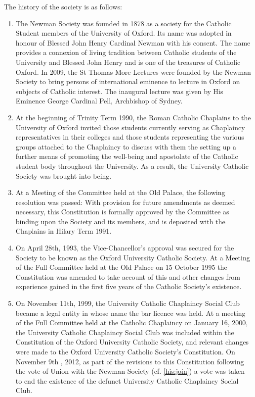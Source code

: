 \documentclass[11pt]{article}
\begin{document}
\begin{enumerate}
The history of the society is as follows:
\begin{enumerate}
\item \label{his:fou} The Newman Society was founded in 1878 as a society for the Catholic Student members of the University of Oxford.  Its name was adopted in honour of Blessed John Henry Cardinal Newman with his consent. The name provides a connexion of living tradition between Catholic students of the University and Blessed John Henry and is one of the treasures of Catholic Oxford. In 2009, the St Thomas More Lectures were founded by the Newman Society to bring persons of international eminence to lecture in Oxford on subjects of Catholic interest. The inaugural lecture was given by His Eminence George Cardinal Pell, Archbishop of Sydney.
\item \label{his:rep} At the beginning of Trinity Term 1990, the Roman Catholic Chaplains to the University of Oxford invited those students currently serving as Chaplaincy representatives in their colleges and those students representing the various groups attached to the Chaplaincy to discuss with them the setting up a further means of promoting the well-being and apostolate of the Catholic student body throughout the University. As a result, the University Catholic Society was brought into being.
\item \label{his:con} At a Meeting of the Committee held at the Old Palace, the following resolution was passed: With provision for future amendments as deemed necessary, this Constitution is formally approved by the Committee as binding upon the Society and its members, and is deposited with the Chaplains in Hilary Term 1991.
\item On April 28th, 1993, the Vice-Chancellor's approval was secured for the Society to be known as the Oxford University Catholic Society. At a Meeting of the Full Committee held at the Old Palace on 15 October 1995 the Constitution was amended to take account of this and other changes from experience gained in the first five years of the Catholic Society's existence.
\item On November 11th, 1999, the University Catholic Chaplaincy Social Club became a legal entity in whose name the bar licence was held. At a meeting of the Full Committee held at the Catholic Chaplaincy on January 16, 2000, the University Catholic Chaplaincy Social Club was included within the Constitution of the Oxford University Catholic Society, and relevant changes were made to the Oxford University Catholic Society's Constitution. On November 9th , 2012, as part of the revisions to this Constitution following the vote of Union with the Newman Society (cf. \cref{his:join}) a vote was taken to end the existence of the defunct University Catholic Chaplaincy Social Club. 

\end{enumerate}
\end{enumerate}
\end{document}
